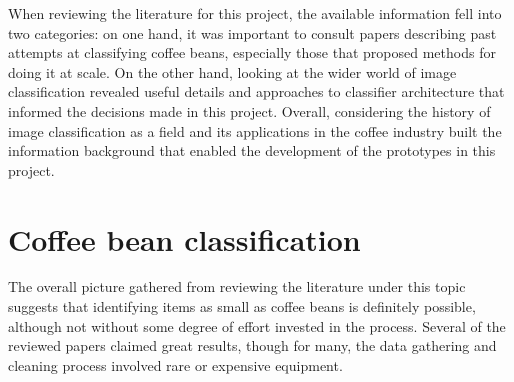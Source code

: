 When reviewing the literature for this project, the available information fell into two categories:
on one hand, it was important to consult papers describing past attempts at classifying coffee beans,
especially those that proposed methods for doing it at scale.
On the other hand, looking at the wider world of image classification revealed useful details and approaches to
classifier architecture that informed the decisions made in this project.
Overall, considering the history of image classification as a field and its applications in the coffee industry
built the information background that enabled the development of the prototypes in this project.

\section{Coffee bean classification}
\label{sec:lit-review-coffee}
The overall picture gathered from reviewing the literature under this topic suggests that identifying
items as small as coffee beans is definitely possible, although not without some degree of effort invested in the process.
Several of the reviewed papers claimed great results, though for many, the data gathering and cleaning process involved
rare or expensive equipment.

